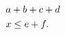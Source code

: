 \documentclass{article}
\begin{document}
\begin{eqnarray*}
\lefteqn{a+b+c+d}&\\
&x\leq e+f.
\end{eqnarray*}
\end{document}
